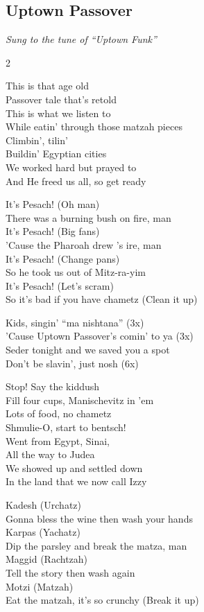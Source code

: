 \pagebreak
\subsection*{Uptown Passover}
\textit{Sung to the tune of ``Uptown Funk''}

\begin{multicols}{2}

This is that age old \\
Passover tale that's retold \\
This is what we listen to \\
While eatin' through those matzah pieces \\
Climbin', tilin' \\
Buildin' Egyptian cities \\
We worked hard but prayed to {\god} \\
And He freed us all, so get ready

It's Pesach! (Oh man) \\
There was a burning bush on fire, man \\
It's Pesach! (Big fans) \\
'Cause the Pharoah drew {\god}'s ire, man \\
It's Pesach! (Change pans) \\
So he took us out of Mitz-ra-yim \\
It's Pesach! (Let's scram) \\
So it's bad if you have chametz (Clean it up)

Kids, singin' ``ma nishtana'' (3x) \\
'Cause Uptown Passover's comin' to ya (3x) \\
Seder tonight and we saved you a spot \\
Don't be slavin', just nosh (6x)

Stop! Say the kiddush \\
Fill four cups, Manischevitz in 'em \\
Lots of food, no chametz \\
Shmulie-O, start to bentsch! \\
Went from Egypt, Sinai, \\
All the way to Judea \\
We showed up and settled down \\
In the land that we now call Izzy

Kadesh (Urchatz) \\
Gonna bless the wine then wash your hands \\
Karpas (Yachatz) \\
Dip the parsley and break the matza, man \\
Maggid (Rachtzah) \\
Tell the story then wash again \\
Motzi (Matzah) \\
Eat the matzah, it's so crunchy (Break it up)


\end{multicols}
